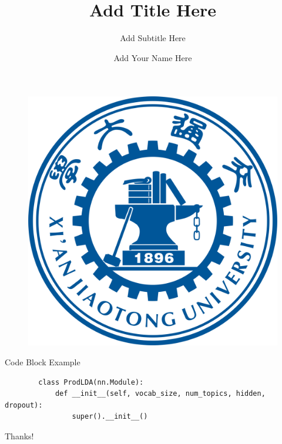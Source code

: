 \documentclass{beamer}
\author{Add Your Name Here}
\title{Add Title Here}
\subtitle{Add Subtitle Here}
\institute{Add Institute Here}
\date{\zhtoday}
\begin{document}
\begin{frame}
    \titlepage
    \begin{figure}[htpb]
        \begin{center}
            \includegraphics[width=0.2\linewidth]{pic/XJUT_Logo.png}
        \end{center}
    \end{figure}
\end{frame}

\begin{frame}
    \tableofcontents[sectionstyle=show,subsectionstyle=show/shaded/hide,subsubsectionstyle=show/shaded/hide]
\end{frame}

\begin{frame}[fragile]{Code Block Example}
    \begin{verbatim}
        class ProdLDA(nn.Module):
            def __init__(self, vocab_size, num_topics, hidden, dropout):
                super().__init__()
    \end{verbatim}
\end{frame}

\begin{frame}
    \begin{center}
        {\Huge\calligra Thanks!}
    \end{center}
\end{frame}

%     
%     
\end{document}
